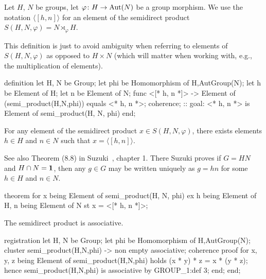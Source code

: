 \begin{definition}
Let $H$, $N$ be groups, let $\varphi\colon H\to\operatorname{Aut}(N)$ be a group morphism.
We use the notation $\langle[h,n]\rangle$ for an element of the
semidirect product $S(H,N,\varphi)=N\rtimes_{\varphi} H$.
\end{definition}

\begin{def-remark}
This definition is just to avoid ambiguity when referring to elements of
$S(H,N,\varphi)$ as opposed to $H\times N$ (which will matter when
working with, e.g., the multiplication of elements).
\end{def-remark}

\begin{mizar}
definition
  let H, N be Group;
  let phi be Homomorphism of H,AutGroup(N);
  let h be Element of H;
  let n be Element of N;
  func <[* h, n *]> -> Element of (semi_product(H,N,phi))
  equals <* h, n *>;
  coherence;
  :: goal: <* h, n *> is Element of semi_product(H, N, phi)
end;
\end{mizar}

\begin{theorem}
For any element of the semidirect product $x\in S(H, N, \varphi)$,
there exists elements $h\in H$ and $n\in N$ such that $x=\langle[h,n]\rangle$.
\end{theorem}

\begin{thm-remark}
See also Theorem (8.8) in Suzuki~\cite{suzuki1982group}, chapter 1.
There Suzuki proves if $G=HN$ and $H\cap N=\mathbf{1}$, then any
$g\in G$ may be written uniquely as $g=hn$ for some $h\in H$ and $n\in N$.
\end{thm-remark}

\begin{mizar}
theorem
  for x being Element of semi_product(H, N, phi)
  ex h being Element of H, n being Element of N
  st x = <[* h, n *]>;
\end{mizar}

\begin{registration}
The semidirect product is associative.
\end{registration}

\begin{mizar}
registration
  let H, N be Group;
  let phi be Homomorphism of H,AutGroup(N);
  cluster semi_product(H,N,phi) -> non empty associative;
  coherence
  proof
    for x, y, z being Element of semi_product(H,N,phi)
    holds (x * y) * z = x * (y * z);
    hence semi_product(H,N,phi) is associative by GROUP_1:def 3;
  end;
end;
\end{mizar}

